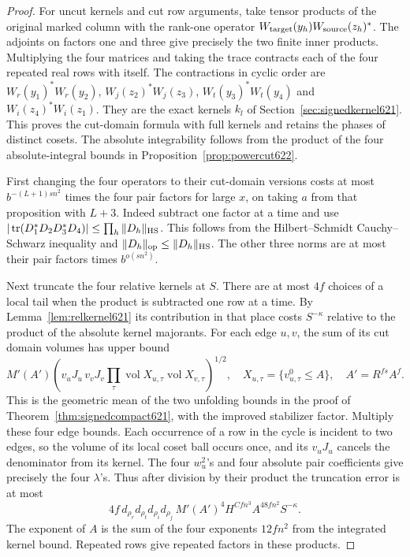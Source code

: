 \documentclass[a4paper,11pt]{article}
\theoremstyle{definition}
\theoremstyle{remark}
\numberwithin{equation}{section}
\begin{document}
\begin{proof}
For uncut kernels and cut row arguments, take tensor products
of the original marked column with the rank-one operator
\(W_{\rm target}(y_h)W_{\rm source}(z_h)^*\).
The adjoints on factors one and three give precisely the
two finite inner products. Multiplying the four matrices and
taking the trace contracts each of the four repeated real
rows with itself. The contractions in cyclic order are
\(W_r(y_1)^*W_r(y_2)\), \(W_j(z_2)^*W_j(z_3)\),
\(W_t(y_3)^*W_t(y_4)\) and \(W_i(z_4)^*W_i(z_1)\).
They are the exact kernels \(k_l\) of
Section~\ref{sec:signedkernel621}. This proves the cut-domain
formula with full kernels and retains the phases of distinct
cosets. The absolute integrability follows from the product
of the four absolute-integral bounds in
Proposition~\ref{prop:powercut622}.

First changing the four operators to their cut-domain
versions costs at most \(b^{-(L+1)sn^2}\) times the four
pair factors for large \(x\), on taking \(a\) from that
proposition with \(L+3\). Indeed subtract one factor at a
time and use
\(|\operatorname{tr}(D_1^*D_2D_3^*D_4)|
       \le\prod_h\|D_h\|_{\rm HS}\).
This follows from the Hilbert--Schmidt Cauchy--Schwarz
inequality and \(\|D_h\|_{\rm op}\le\|D_h\|_{\rm HS}\).
The other three norms are at most their pair factors times
\(b^{o(sn^2)}\).

Next truncate the four relative kernels at \(S\).
There are at most \(4f\) choices of a local tail when the
product is subtracted one row at a time. By
Lemma~\ref{lem:relkernel621} its contribution in that place
costs \(S^{-\kappa}\) relative to the product of the absolute
kernel majorants. For each edge \(u,v\), the sum of its cut
domain volumes has upper bound
\[
 M'(A')\left(
   v_uJ_u\, v_vJ_v
      \prod_{\tau}\operatorname{vol}X_{u,\tau}
                      \operatorname{vol}X_{v,\tau}\right)^{1/2},
 \quad X_{u,\tau}=\{v^0_{u,\tau}\le A\},\quad A'=R^{fs}A^f .
\]
This is the geometric mean of the two unfolding bounds in the
proof of Theorem~\ref{thm:signedcompact621}, with the improved
stabilizer factor. Multiply these four edge bounds. Each
occurrence of a row in the cycle is incident to two edges,
so the volume of its local coset ball occurs once, and its
\(v_uJ_u\) cancels the denominator from its kernel.
The four \(w_u^2\)'s and four absolute pair coefficients
give precisely the four \(\lambda\)'s. Thus after division by
their product the truncation error is at most
\[
  4 f\, d_{\rho_r}d_{\rho_t}d_{\rho_i}d_{\rho_j}\,
       M'(A')^4 H^{Cfn^3} A^{48 f n^2}S^{-\kappa}.
\]
The exponent of \(A\) is the sum of the four exponents
\(12fn^2\) from the integrated kernel bound. Repeated rows
give repeated factors in these products.


\end{proof}
\end{document}
